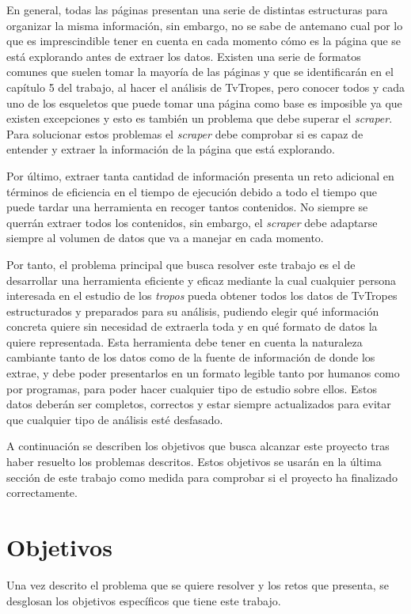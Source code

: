 En general, todas las páginas presentan una serie de distintas estructuras para
organizar la misma información, sin embargo, no se sabe de antemano cual por lo
que es imprescindible tener en cuenta en cada momento cómo es la página que se
está explorando antes de extraer los datos. Existen una serie de formatos
comunes que suelen tomar la mayoría de las páginas y que se identificarán en el
capítulo 5 del trabajo, al hacer el análisis de TvTropes, pero conocer todos y
cada uno de los esqueletos que puede tomar una página como base es imposible ya
que existen excepciones y esto es también un problema que debe superar el
\textit{scraper}. Para solucionar estos problemas el \textit{scraper} debe
comprobar si es capaz de entender y extraer la información de la página que está
explorando.

Por último, extraer tanta cantidad de información presenta un reto adicional en
términos de eficiencia en el tiempo de ejecución debido a todo el tiempo que
puede tardar una herramienta en recoger tantos contenidos. No siempre se querrán
extraer todos los contenidos, sin embargo, el \textit{scraper} debe adaptarse
siempre al volumen de datos que va a manejar en cada momento.

Por tanto, el problema principal que busca resolver este trabajo es el de
desarrollar una herramienta eficiente y eficaz mediante la cual cualquier
persona interesada en el estudio de los \textit{tropos} pueda obtener todos los
datos de TvTropes estructurados y preparados para su análisis, pudiendo elegir
qué información concreta quiere sin necesidad de extraerla toda y en qué formato
de datos la quiere representada. Esta herramienta debe tener en cuenta la
naturaleza cambiante tanto de los datos como de la fuente de información de
donde los extrae, y debe poder presentarlos en un formato legible tanto por
humanos como por programas, para poder hacer cualquier tipo de estudio sobre
ellos. Estos datos deberán ser completos, correctos y estar siempre actualizados
para evitar que cualquier tipo de análisis esté desfasado.

A continuación se describen los objetivos que busca alcanzar este proyecto tras
haber resuelto los problemas descritos. Estos objetivos se usarán en la última
sección de este trabajo como medida para comprobar si el proyecto ha finalizado
correctamente.

\section{Objetivos}
Una vez descrito el problema que se quiere resolver y los retos que presenta, se
desglosan los objetivos específicos que tiene este trabajo.

